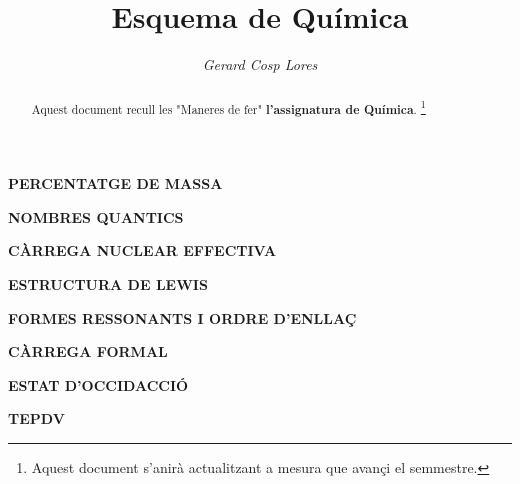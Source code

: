 \documentclass[11pt]{article}
\title{\textbf{Esquema de Química}}
\author{\textit{Gerard Cosp Lores}}
\date{}
\begin{document}
\maketitle

\begin{abstract}
Aquest document recull les "Maneres de fer" \textbf{l'assignatura de Química}. \footnote{Aquest document s'anirà actualitzant a mesura que avançi el semmestre.} 
\end{abstract}

\begin{tcolorbox}[
    colback=white,
    colframe=black,
    boxrule=0.8pt,
    arc=0pt
]

\textbf{PERCENTATGE DE MASSA}

\end{tcolorbox}

\begin{tcolorbox}[
    colback=white,
    colframe=black,
    boxrule=0.8pt,
    arc=0pt
]

\textbf{NOMBRES QUANTICS}

\end{tcolorbox}
\begin{tcolorbox}[
    colback=white,
    colframe=black,
    boxrule=0.8pt,
    arc=0pt
]

\textbf{CÀRREGA NUCLEAR EFFECTIVA}

\end{tcolorbox}

\begin{tcolorbox}[
    colback=white,
    colframe=black,
    boxrule=0.8pt,
    arc=0pt
]

\textbf{ESTRUCTURA DE LEWIS}

\textbf{FORMES RESSONANTS I ORDRE D'ENLLAÇ}

\textbf{CÀRREGA FORMAL}

\textbf{ESTAT D'OCCIDACCIÓ}

\textbf{TEPDV}

\end{tcolorbox}
\end{document}
